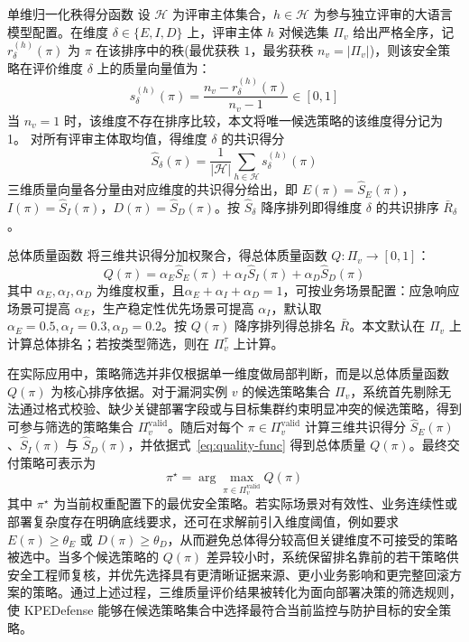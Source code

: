 \begin{flatdefinition}{单维归一化秩得分函数}\label{def:ranking}
设 $\mathcal{H}$ 为评审主体集合，$h\in\mathcal{H}$ 为参与独立评审的大语言模型配置。在维度 $\delta\in\{E,I,D\}$ 上，评审主体 $h$ 对候选集 $\Pi_v$ 给出严格全序，记 $r_{\delta}^{(h)}(\pi)$ 为 $\pi$ 在该排序中的秩(最优获秩 $1$，最劣获秩 $n_v=|\Pi_v|$)，则该安全策略在评价维度 $\delta$ 上的质量向量值为：
\begin{equation}\label{eq:rank-score}
s_{\delta}^{(h)}(\pi)=\frac{n_v-r_{\delta}^{(h)}(\pi)}{n_v-1}\in[0,1]
\end{equation}
当 $n_v=1$ 时，该维度不存在排序比较，本文将唯一候选策略的该维度得分记为 1。
对所有评审主体取均值，得维度 $\delta$ 的共识得分
\begin{equation}\label{eq:consensus-score}
\hat S_{\delta}(\pi)=\frac{1}{|\mathcal{H}|}\sum_{h\in\mathcal{H}}s_{\delta}^{(h)}(\pi)
\end{equation}
三维质量向量各分量由对应维度的共识得分给出，即 $E(\pi)=\hat S_E(\pi)$，$I(\pi)=\hat S_I(\pi)$，$D(\pi)=\hat S_D(\pi)$。按 $\hat S_{\delta}$ 降序排列即得维度 $\delta$ 的共识排序 $\bar R_{\delta}$。
\end{flatdefinition}




\begin{flatdefinition}{总体质量函数}
\label{def:overall-quality}
将三维共识得分加权聚合，得总体质量函数 $Q\colon\Pi_v\to[0,1]$：
\begin{equation}\label{eq:quality-func}
Q(\pi)=\alpha_E\hat S_E(\pi)+\alpha_I\hat S_I(\pi)+\alpha_D\hat S_D(\pi)
\end{equation}
其中 $\alpha_E,\alpha_I,\alpha_D$ 为维度权重，且$\alpha_E+\alpha_I+\alpha_D=1$，可按业务场景配置：应急响应场景可提高 $\alpha_E$，生产稳定性优先场景可提高 $\alpha_I$，默认取 $\alpha_E=0.5,\alpha_I=0.3,\alpha_D=0.2$。按 $Q(\pi)$ 降序排列得总排名 $\bar R$。本文默认在 $\Pi_v$ 上计算总体排名；若按类型筛选，则在 $\Pi_v^{\tau}$ 上计算。
\end{flatdefinition}

在实际应用中，策略筛选并非仅根据单一维度做局部判断，而是以总体质量函数 $Q(\pi)$ 为核心排序依据。对于漏洞实例 $v$ 的候选策略集合 $\Pi_v$，系统首先剔除无法通过格式校验、缺少关键部署字段或与目标集群约束明显冲突的候选策略，得到可参与筛选的策略集合 $\Pi_v^{\mathrm{valid}}$。随后对每个 $\pi\in\Pi_v^{\mathrm{valid}}$ 计算三维共识得分 $\hat S_E(\pi)$、$\hat S_I(\pi)$ 与 $\hat S_D(\pi)$，并依据式~\eqref{eq:quality-func} 得到总体质量 $Q(\pi)$。最终交付策略可表示为
\begin{equation}\label{eq:best-strategy}
\pi^{\star}=\arg\max_{\pi\in\Pi_v^{\mathrm{valid}}} Q(\pi)
\end{equation}
其中 $\pi^{\star}$ 为当前权重配置下的最优安全策略。若实际场景对有效性、业务连续性或部署复杂度存在明确底线要求，还可在求解前引入维度阈值，例如要求 $E(\pi)\geq\theta_E$ 或 $D(\pi)\geq\theta_D$，从而避免总体得分较高但关键维度不可接受的策略被选中。当多个候选策略的 $Q(\pi)$ 差异较小时，系统保留排名靠前的若干策略供安全工程师复核，并优先选择具有更清晰证据来源、更小业务影响和更完整回滚方案的策略。通过上述过程，三维质量评价结果被转化为面向部署决策的筛选规则，使 KPEDefense 能够在候选策略集合中选择最符合当前监控与防护目标的安全策略。

